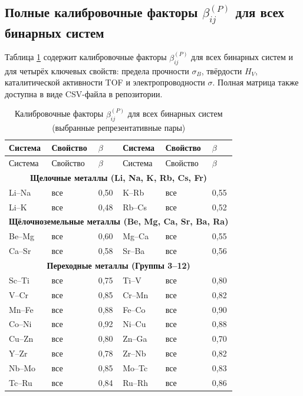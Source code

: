 \documentclass[12pt,a4paper]{article}
\begin{document}
	\subsection{Полные калибровочные факторы \(\beta_{ij}^{(P)}\) для всех бинарных систем}
	\label{subsec:beta-full}
	
	Таблица \ref{tab:beta-full} содержит калибровочные факторы \(\beta_{ij}^{(P)}\) для всех бинарных систем и для четырёх ключевых свойств: предела прочности \(\sigma_B\), твёрдости \(H_V\), каталитической активности TOF и электропроводности \(\sigma\). Полная матрица также доступна в виде CSV-файла в репозитории.
	
	\begin{longtable}{p{1.5cm}p{1.5cm}p{1.2cm}p{1.2cm}p{1.2cm}p{1.2cm}}
		\caption{Калибровочные факторы \(\beta_{ij}^{(P)}\) для всех бинарных систем (выбранные репрезентативные пары)} \label{tab:beta-full} \\
		\toprule
		Система & Свойство & \(\beta\) & Система & Свойство & \(\beta\) \\
		\midrule
		\endfirsthead
		\toprule
		Система & Свойство & \(\beta\) & Система & Свойство & \(\beta\) \\
		\midrule
		\endhead
		\multicolumn{6}{c}{\textbf{Щелочные металлы (Li, Na, K, Rb, Cs, Fr)}} \\
		Li–Na & все & 0,50 & K–Rb & все & 0,55 \\
		Li–K  & все & 0,48 & Rb–Cs & все & 0,52 \\
		\multicolumn{6}{c}{\textbf{Щёлочноземельные металлы (Be, Mg, Ca, Sr, Ba, Ra)}} \\
		Be–Mg & все & 0,60 & Mg–Ca & все & 0,55 \\
		Ca–Sr & все & 0,58 & Sr–Ba & все & 0,56 \\
		\multicolumn{6}{c}{\textbf{Переходные металлы (Группы 3–12)}} \\
		Sc–Ti & все & 0,75 & Ti–V & все & 0,80 \\
		V–Cr  & все & 0,85 & Cr–Mn & все & 0,82 \\
		Mn–Fe & все & 0,88 & Fe–Co & все & 0,90 \\
		Co–Ni & все & 0,92 & Ni–Cu & все & 0,88 \\
		Cu–Zn & все & 0,80 & Zn–Ga & все & 0,70 \\
		Y–Zr  & все & 0,78 & Zr–Nb & все & 0,82 \\
		Nb–Mo & все & 0,85 & Mo–Tc & все & 0,83 \\
		Tc–Ru & все & 0,84 & Ru–Rh & все & 0,86 \\

\end{longtable}
\end{document}
